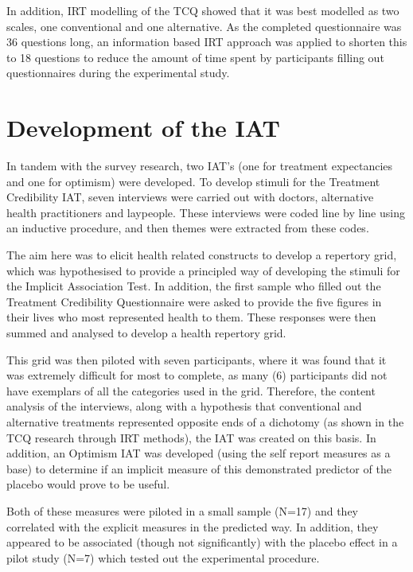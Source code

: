 \documentclass{article}
\begin{document}
In addition, IRT modelling of the TCQ showed that it was best modelled as two scales, one conventional and one alternative. As the completed questionnaire was 36 questions long, an information based IRT approach was applied to shorten this to 18 questions to reduce the amount of time spent by participants filling out questionnaires during the experimental study. 

\section{Development of the IAT}
\label{sec:development-iat}

In tandem with the survey research, two IAT's (one for treatment expectancies and one for optimism) were developed. To develop stimuli for the Treatment Credibility IAT, seven interviews were carried out with doctors, alternative health practitioners and laypeople. These interviews were coded line by line using an inductive procedure, and then themes were extracted from these codes. 

The aim here was to elicit health related constructs to develop a repertory grid, which was hypothesised to provide a principled way of developing the stimuli for the Implicit Association Test. In addition, the first sample who filled out the Treatment Credibility Questionnaire were asked to provide the five figures in their lives who most represented health to them. These responses were then summed and analysed to develop a health repertory grid. 

This grid was then piloted with seven participants, where it was found that it was extremely difficult for most to complete, as many (6) participants did not have exemplars of all the categories used in the grid. Therefore, the content analysis of the interviews, along with a hypothesis that conventional and alternative treatments represented opposite ends of a dichotomy (as shown in the TCQ research through IRT methods), the IAT was created on this basis. In addition, an Optimism IAT was developed (using the self report measures as a base) to determine if an implicit measure of this demonstrated predictor of the placebo would prove to be useful. 

Both of these measures were piloted in a small sample (N=17) and they correlated with the explicit measures in the predicted way. In addition, they appeared to be associated (though not significantly) with the placebo effect in a pilot study (N=7) which tested out the experimental procedure.
\end{document}
